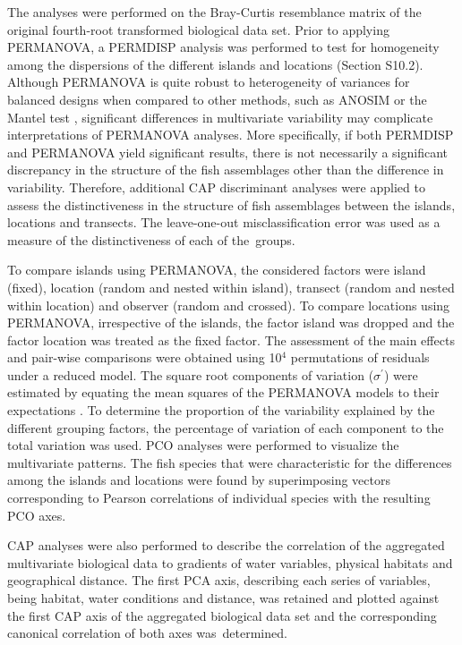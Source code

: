 \documentclass[jmse,article,accept,moreauthors,pdftex]{Definitions/mdpi}
\begin{document}
The analyses were performed on the Bray-Curtis resemblance matrix of the original fourth-root transformed biological data set. Prior to applying PERMANOVA, a PERMDISP analysis was performed to test for homogeneity among the dispersions of the different islands and locations \citep{Anderson2015} (Section S10.2). %
Although PERMANOVA is quite robust to heterogeneity of variances for balanced designs when compared to other methods, such as ANOSIM or the Mantel test \citep{Anderson2016}, significant differences in multivariate variability may complicate interpretations of PERMANOVA analyses. More specifically, if both PERMDISP and PERMANOVA yield significant results, there is not necessarily a significant discrepancy in the structure of the fish assemblages other than the difference in variability. Therefore, additional CAP discriminant analyses were applied to assess the distinctiveness in the structure of fish assemblages between the islands, locations and transects. The leave-one-out misclassification error was used as a measure of the distinctiveness of each of the~groups.

To compare islands using PERMANOVA, the considered factors were island (fixed), location (random and nested within island), transect (random and nested within location) and observer (random and crossed). To compare locations using PERMANOVA, irrespective of the islands, the factor island was dropped and the factor location was treated as the fixed factor. The assessment of the main effects and pair-wise comparisons were obtained using 10$^{4}$ permutations of residuals under a reduced model. The square root components of variation ($\sigma^{'}$) were estimated by equating the mean squares of the PERMANOVA models to their expectations \citep{Anderson2008PERMANOVA+Methods}. To determine the proportion of the variability explained by the different grouping factors, the percentage of variation of each component to the total variation was used. PCO analyses were performed to visualize the multivariate patterns. The fish species that were characteristic for the differences among the islands and locations were found by superimposing vectors corresponding to Pearson correlations of individual species with the resulting PCO axes.

CAP analyses were also performed to describe the correlation of the aggregated multivariate biological data to gradients of water variables, physical habitats and geographical distance. The first PCA axis, describing each series of variables, being habitat, water conditions and distance, was retained and plotted against the first CAP axis of the aggregated biological data set and the corresponding canonical correlation of both axes was~determined.
\end{document}
